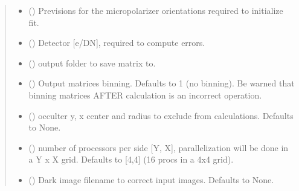 \documentclass[letterpaper,10pt,english]{sphinxmanual}
\begin{document}
\begin{fulllineitems}
\begin{quote}
\begin{description}
\begin{itemize}
\item {} 
\sphinxAtStartPar
{} (\sphinxstyleliteralemphasis{\sphinxupquote{{[}}}\sphinxstyleliteralemphasis{\sphinxupquote{{]}}}) \textendash{} Previsions for the micropolarizer orientations required to initialize fit.

\item {} 
\sphinxAtStartPar
{} () \textendash{} Detector {[}e\sphinxhyphen{}/DN{]}, required to compute errors.

\item {} 
\sphinxAtStartPar
{} () \textendash{} output folder to save matrix to.

\item {} 
\sphinxAtStartPar
{} (\sphinxstyleliteralemphasis{\sphinxupquote{, }}) \textendash{} Output matrices binning. Defaults to 1 (no binning). Be warned that binning matrices AFTER calculation is an incorrect operation.

\item {} 
\sphinxAtStartPar
{} (\sphinxstyleliteralemphasis{\sphinxupquote{, }}) \textendash{} occulter y, x center and radius to exclude from calculations. Defaults to None.

\item {} 
\sphinxAtStartPar
{} (\sphinxstyleliteralemphasis{\sphinxupquote{{[}}}\sphinxstyleliteralemphasis{\sphinxupquote{, }}\sphinxstyleliteralemphasis{\sphinxupquote{{]}}}\sphinxstyleliteralemphasis{\sphinxupquote{, }}) \textendash{} number of processors per side {[}Y, X{]}, parallelization will be done in a Y x X grid. Defaults to {[}4,4{]} (16 procs in a 4x4 grid).

\item {} 
\sphinxAtStartPar
{} (\sphinxstyleliteralemphasis{\sphinxupquote{, }}) \textendash{} Dark image filename to correct input images. Defaults to None.


\end{itemize}
\end{description}
\end{quote}
\end{fulllineitems}
\end{document}

